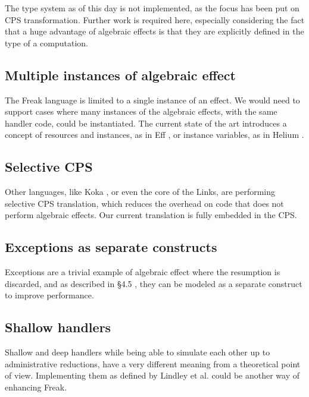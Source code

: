 \documentclass[declaration,shortabstract]{iithesis}
\begin{document}
    The type system as of this day is not implemented, as the focus has been put
    on CPS transformation. Further work is required here, especially considering
    the fact that a huge advantage of algebraic effects is that they are explicitly
    defined in the type of a computation.

    \subsection{Multiple instances of algebraic effect}

    The Freak language is limited to a single instance of an effect. We would
    need to support cases where many instances of the algebraic effects, with
    the same handler code, could be instantiated. The current state of the
    art introduces a concept of resources and instances, as in Eff \cite{programming-in-eff},
    or instance variables, as in Helium \cite{binders-labels}.

    \subsection{Selective CPS}

    Other languages, like Koka \cite{leijen-koka}, or even the core of the Links, are
    performing selective CPS translation, which reduces the overhead on code
    that does not perform algebraic effects. Our current translation is fully
    embedded in the CPS.

    \subsection{Exceptions as separate constructs}

    Exceptions are a trivial example of algebraic effect where the resumption is
    discarded, and as described in \S 4.5 \cite{handlers-cps}, they can be modeled
    as a separate construct to improve performance.

    \subsection{Shallow handlers}

    Shallow and deep handlers while being able to simulate each other up to
    administrative reductions, have a very different meaning from a theoretical
    point of view. Implementing them as defined by Lindley et al. \cite{shallow-handlers} could
    be another way of enhancing Freak.




\printbibliography
\end{document}
